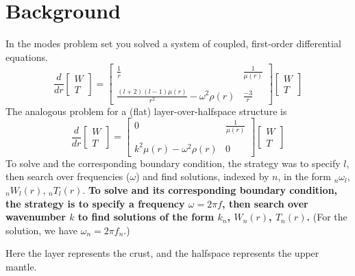 \documentclass[11pt,titlepage,fleqn]{article}
\begin{document}

\pagebreak
\section*{Background}

In the modes problem set you solved a system of coupled, first-order differential equations.
%
\begin{equation}
\frac{d}{dr}
\left[ \begin{array}{c} W \\ T \end{array} \right]
=
\left[ \begin{array}{cc}
\frac{1}{r} & \frac{1}{\mu(r)} \\
& \\
\frac{(l+2)(l-1)\mu(r)}{r^2} -\omega^2\rho(r)  & \frac{-3}{r}
\end{array} \right]
\left[ \begin{array}{c} W \\ T \end{array} \right]
\label{ODEs}
\end{equation}
%
The analogous problem for a (flat) layer-over-halfspace structure is
%
\begin{equation}
\frac{d}{dr}
\left[ \begin{array}{c} W \\ T \end{array} \right]
=
\left[ \begin{array}{cc}
0 & \frac{1}{\mu(r)} \\
& \\
k^2 \mu(r)-\omega^2\rho(r) & 0
\end{array} \right]
\left[ \begin{array}{c} W \\ T \end{array} \right]
\label{rODEs}
\end{equation}
%
To solve  and the corresponding boundary condition, the strategy was to specify $l$, then search over frequencies ($\omega$) and find solutions, indexed by $n$, in the form $_n\omega_l$, $_nW_l(r)$, $_nT_l(r)$. {\bf To solve  and its corresponding boundary condition, the strategy is to specify a frequency $\omega = 2\pi f$, then search over wavenumber $k$ to find solutions of the form $k_n$, $W_n(r)$, $T_n(r)$.} (For the solution, we have $\omega_n = 2\pi f_n$.)

Here the layer represents the crust, and the halfspace represents the upper mantle.
\end{document}
